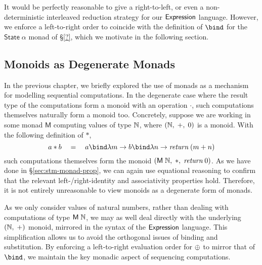\noindent It would be perfectly reasonable to give a right-to-left, or even
a non-deterministic interleaved reduction strategy for our $\textsf{Expression}$
language. However, we enforce a left-to-right order to coincide with the
definition of $\bind$ for the $\mathsf{State}\;\alpha$ monad of \S\ref{?},
which we motivate in the following section.


\subsection{Monoids as Degenerate Monads}\label{sec:semantics-degenerate}%

In the previous chapter, we briefly explored the use of monads as
a mechanism for modelling sequential computations. In the degenerate case
where the result type of the computations form a monoid with an operation
$\cdot$, such computations themselves naturally form a monoid too.
Concretely, suppose we are working in some monad $\mathsf{M}$ computing
values of type $\mathbb{N}$, where $(\mathbb{N},\;+,\;0)$ is a monoid. With the
following definition of $\ast$,
\[
	a \ast b \quad=\quad
		a \bind \lambda m \rightarrow
		b \bind \lambda n \rightarrow
		\textit{return}\;(m + n)
\]
such computations themselves form the monoid
$(\mathsf{M}\;\mathbb{N},\;\ast,\;\textit{return}\;0)$. As we have done in
\S\ref{sec:stm-monad-prop}, we can again use equational reasoning to confirm
that the relevant left-/right-identity and associativity properties hold.
Therefore, it is not entirely unreasonable to view monoids as a degenerate
form of monads.

As we only consider values of natural numbers, rather than dealing with
computations of type $\mathsf{M}\;\mathbb{N}$, we may as well deal directly with
the underlying $(\mathbb{N},\;+)$ monoid, mirrored in the syntax of the
$\textsf{Expression}$ language. This simplification allows us to avoid the
orthogonal issues of binding and substitution. By enforcing a left-to-right
evaluation order for $\oplus$ to mirror that of $\bind$, we maintain the key
monadic aspect of sequencing computations.


